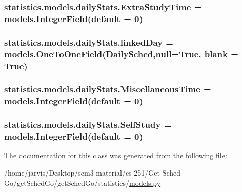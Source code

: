 \subsubsection[{\texorpdfstring{Extra\+Study\+Time}{ExtraStudyTime}}]{\setlength{\rightskip}{0pt plus 5cm}statistics.\+models.\+daily\+Stats.\+Extra\+Study\+Time = models.\+Integer\+Field(default = 0)\hspace{0.3cm}{\ttfamily [static]}}\hypertarget{classstatistics_1_1models_1_1dailyStats_aeb884bf88e957e71ca2ac54417f7cc5d}{}\label{classstatistics_1_1models_1_1dailyStats_aeb884bf88e957e71ca2ac54417f7cc5d}
\subsubsection[{\texorpdfstring{linked\+Day}{linkedDay}}]{\setlength{\rightskip}{0pt plus 5cm}statistics.\+models.\+daily\+Stats.\+linked\+Day = models.\+One\+To\+One\+Field({\bf Daily\+Sched},null=True, blank = True)\hspace{0.3cm}{\ttfamily [static]}}\hypertarget{classstatistics_1_1models_1_1dailyStats_a519ea849b6f94b94f4ed187aeda701be}{}\label{classstatistics_1_1models_1_1dailyStats_a519ea849b6f94b94f4ed187aeda701be}
\subsubsection[{\texorpdfstring{Miscellaneous\+Time}{MiscellaneousTime}}]{\setlength{\rightskip}{0pt plus 5cm}statistics.\+models.\+daily\+Stats.\+Miscellaneous\+Time = models.\+Integer\+Field(default = 0)\hspace{0.3cm}{\ttfamily [static]}}\hypertarget{classstatistics_1_1models_1_1dailyStats_af0edffeea33ea7e79d3a5702798a4478}{}\label{classstatistics_1_1models_1_1dailyStats_af0edffeea33ea7e79d3a5702798a4478}
\subsubsection[{\texorpdfstring{Self\+Study}{SelfStudy}}]{\setlength{\rightskip}{0pt plus 5cm}statistics.\+models.\+daily\+Stats.\+Self\+Study = models.\+Integer\+Field(default = 0)\hspace{0.3cm}{\ttfamily [static]}}\hypertarget{classstatistics_1_1models_1_1dailyStats_a45fb03a98db2062537d449f60e9f8f71}{}\label{classstatistics_1_1models_1_1dailyStats_a45fb03a98db2062537d449f60e9f8f71}


The documentation for this class was generated from the following file\+:\begin{DoxyCompactItemize}
\item 
/home/jarvis/\+Desktop/sem3 material/cs 251/\+Get-\/\+Sched-\/\+Go/get\+Sched\+Go/get\+Sched\+Go/statistics/\hyperlink{statistics_2models_8py}{models.\+py}\end{DoxyCompactItemize}

